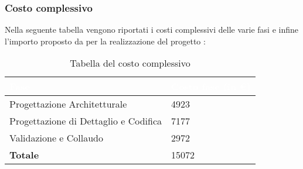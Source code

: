 \subsubsection{Costo complessivo}
Nella seguente tabella vengono riportati i costi complessivi delle varie fasi e infine l'importo proposto da \Gruppo{} per la realizzazione del progetto \NomeProgetto{}:\\
{
\renewcommand{\arraystretch}{2}
\begin{longtable}{ C{5cm} C{5cm}}
\caption{Tabella del costo complessivo}\\

\textcolor{white}{\textbf{Fase}} &
\textcolor{white}{\textbf{Costo fase (in \euro{})}}\\	
\endhead
		
Progettazione Architetturale          &  4923 \\
Progettazione di Dettaglio e Codifica &  7177 \\
Validazione e Collaudo                &  2972 \\
\textbf{Totale}                       & 15072 \\

\end{longtable}
}